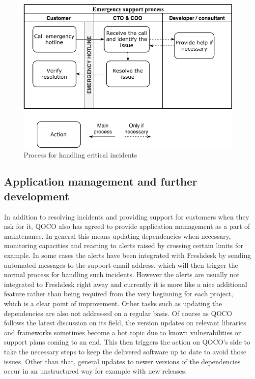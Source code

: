 \begin{figure}[H]
	\begin{center}
		\includegraphics[width=.8\textwidth]{images/Emergency_support_process}
		\caption{Process for handling critical incidents}
		\label{fig:emergency}
	\end{center}
\end{figure}


\subsection{Application management and further development}
In addition to resolving incidents and providing support for customers when they ask for it, QOCO also has agreed to provide application management as a part of maintenance.
In general this means updating dependencies when necessary, monitoring capacities and reacting to alerts raised by crossing certain limits for example. In some cases the
alerts have been integrated with Freshdesk by sending automated messages to the support email address, which will then trigger the normal process for handling such incidents.
However the alerts are usually not integrated to Freshdesk right away and currently it is more like a nice additional feature rather than being required from the very beginning for each project,
which is a clear point of improvement. Other tasks such as updating the dependencies are also not addressed on a regular basis. Of course as QOCO follows the latest
discussion on its field, the version updates on relevant libraries and frameworks sometimes become a hot topic due to known vulnerabilities or support plans coming to an end. This then 
triggers the action on QOCO's side to take the necessary steps to keep the delivered software up to date to avoid those issues. Other than that, general updates to newer versions
of the dependencies occur in an unstructured way for example with new releases.

